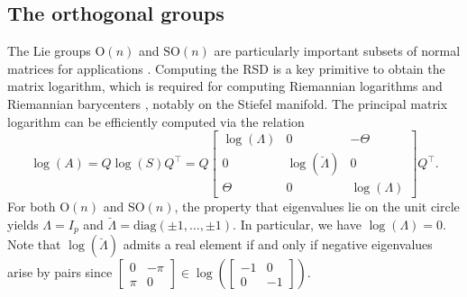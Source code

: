 \documentclass[10pt,twoside,dvipsnames]{siamart1116}
\numberwithin{algorithm}{section}
\numberwithin{equation}{section}
\begin{document}
\subsection{The orthogonal groups}
The Lie groups $\mathrm{O}(n)$ and $\mathrm{SO}(n)$ are particularly important subsets of normal matrices for applications \cite{AbsMahSep2008,Chakraborty2019StatisticsOT,James1954}. Computing the RSD is a key primitive to obtain the matrix logarithm, which is required for computing Riemannian logarithms \cite{mataigne2024,RentmeestersQ,Szwagier23,Zimmermann17,ZimmermannHuper22} and Riemannian barycenters \cite{BINI2013,lirias165866,krakowski07,LIM2012,YING2016,ZimmermannHuper22}, notably on the Stiefel manifold. The principal matrix logarithm can be efficiently computed via the relation 
\begin{equation}\label{eq:log_normal}
	\log(A)=Q\log(S)Q^\top =Q\begin{bmatrix}
	\log(\Lambda)&0&-\Theta\\
	0&\log(\breve{\Lambda})&0\\
	 \Theta&0&\log(\Lambda)
	\end{bmatrix}Q^\top .
\end{equation}
 For both $\mathrm{O}(n)$ and $\mathrm{SO}(n)$, the property that eigenvalues lie on the unit circle yields $\Lambda = I_p$ and $\breve{\Lambda}=\mathrm{diag}(\pm 1,...,\pm 1)$. In particular, we have $\log(\Lambda)=0$. Note that $\log(\breve{\Lambda})$ admits a real element if and only if negative eigenvalues arise by pairs since $\left[\begin{smallmatrix}0&-\pi\\
 \pi&0\end{smallmatrix}\right]\in\log\left(\left[\begin{smallmatrix}-1&0\\
 0&-1\end{smallmatrix}\right]\right)$.


\end{document}
